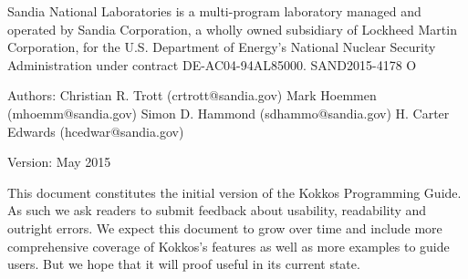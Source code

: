 \documentclass[a4paper,11pt]{book}
\begin{document}

\noindent
Sandia National Laboratories is a multi-program laboratory managed and operated by Sandia 
Corporation, a wholly owned subsidiary of Lockheed Martin Corporation, for the U.S. 
Department of Energy's National Nuclear Security Administration under contract DE-AC04-94AL85000.
\newline
\newline
\noindent
SAND2015-4178 O

\vspace{4cm}
\noindent 
Authors: \newline\newline
Christian R. Trott (crtrott@sandia.gov)\newline
Mark Hoemmen (mhoemm@sandia.gov)\newline
Simon D. Hammond (sdhammo@sandia.gov)\newline
H. Carter Edwards (hcedwar@sandia.gov)

\vspace{1cm}
\noindent 
Version: \newline{} May 2015 \newline\newline

\noindent
This document constitutes the initial version of the Kokkos Programming Guide. 
As such we ask readers to submit feedback about usability, readability and outright errors. 
We expect this document to grow over time and include more comprehensive coverage of 
Kokkos's features as well as more examples to guide users. 
But we hope that it will proof useful in its current state. 

\tableofcontents












\clearpage


%
\end{document}
